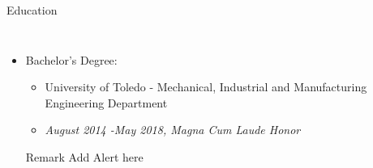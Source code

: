 \begin{frame}{Education}
\begin{columns}
        \begin{itemize}
        \item Bachelor's Degree: 
        \begin{itemize}
          \item University of Toledo - Mechanical, Industrial and Manufacturing Engineering Department
          \item \textit{August 2014 -May 2018, Magna Cum Laude Honor}
        \end{itemize}  
          \begin{block}{Remark}
             Add Alert here
          \end{block}
        \end{itemize}   
    \end{columns}
\end{frame}

